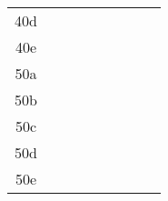 \documentclass[12pt]{article}
\begin{document}
\begin{sidewaystable}[h]
\begin{tabular}{|c|c|c||c|c||c|c||c|c|}
40d & \hspace{1.7cm} & & \hspace{1.7cm} & & \hspace{1.7cm} & & \hspace{1.7cm} & \\
40e & \hspace{1.7cm} & & \hspace{1.7cm} & & \hspace{1.7cm} & & \hspace{1.7cm} & \\
\hline
50a & \hspace{1.7cm} & & \hspace{1.7cm} & & \hspace{1.7cm} & & \hspace{1.7cm} & \\
50b & \hspace{1.7cm} & & \hspace{1.7cm} & & \hspace{1.7cm} & & \hspace{1.7cm} & \\
50c & \hspace{1.7cm} & & \hspace{1.7cm} & & \hspace{1.7cm} & & \hspace{1.7cm} & \\
50d & \hspace{1.7cm} & & \hspace{1.7cm} & & \hspace{1.7cm} & & \hspace{1.7cm} & \\
50e & \hspace{1.7cm} & & \hspace{1.7cm} & & \hspace{1.7cm} & & \hspace{1.7cm} & \\
\hline
\end{tabular}
\end{sidewaystable}
\end{document}
